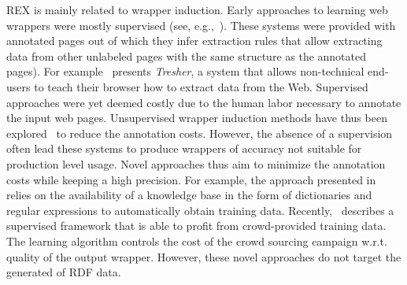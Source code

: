 \documentclass{llncs}
\begin{document}
REX is mainly related to wrapper induction. 
Early approaches to learning web wrappers were mostly supervised (see, e.g.,~\cite{Hogue:2005:TAU:1060745.1060762,flesca2004web}). 
These systems were provided with annotated pages out of which they infer extraction rules that allow extracting data from other unlabeled pages with the same structure as the annotated pages). 
For example~\cite{Hogue:2005:TAU:1060745.1060762} presents \emph{Tresher}, a system that allows non-technical end-users to teach their browser how to extract data from the Web. 
Supervised approaches were yet deemed costly due to the human labor necessary to annotate the input web pages. 
Unsupervised wrapper induction methods have thus been explored~\cite{DBLP:journals/aai/CrescenziM08,exalg} to reduce the annotation costs. 
However, the absence of a supervision often lead these systems to produce wrappers of accuracy not suitable for production level usage.
Novel approaches thus aim to minimize the annotation costs while keeping a high precision.
For example, the approach presented in~\cite{Dalvi:2011:AWL:1938545.1938547} relies on the availability of a knowledge base in the form of dictionaries and regular expressions to automatically obtain training data. 
Recently, \cite{Crescenzi2013}~describes a supervised framework that is able to profit from crowd-provided training data. 
The learning algorithm controls the cost of the crowd sourcing campaign w.r.t. quality of the output wrapper.
However, these novel approaches do not target the generated of RDF data.

\end{document}
